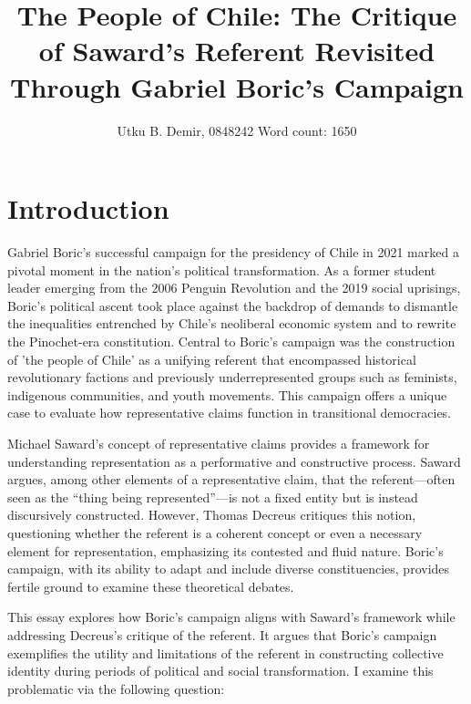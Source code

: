 

\title{\huge{The People of Chile: The Critique of Saward's Referent Revisited Through Gabriel Boric’s Campaign}}
\author{Utku B. Demir, 0848242 \newline \small{Word count: 1650}}


\maketitle
\chapter{Introduction}

Gabriel Boric’s successful campaign for the presidency of Chile in 2021 marked a pivotal moment in the nation’s political transformation. As a former student leader emerging from the 2006 Penguin Revolution and the 2019 social uprisings, Boric’s political ascent took place against the backdrop of demands to dismantle the inequalities entrenched by Chile’s neoliberal economic system and to rewrite the Pinochet-era constitution. Central to Boric’s campaign was the construction of 'the people of Chile' as a unifying referent that encompassed historical revolutionary factions and previously underrepresented groups such as feminists, indigenous communities, and youth movements. This campaign offers a unique case to evaluate how representative claims function in transitional democracies.

Michael Saward’s concept of representative claims provides a framework for understanding representation as a performative and constructive process. Saward argues, among other elements of a representative claim, that the referent—often seen as the “thing being represented”—is not a fixed entity but is instead discursively constructed. However, Thomas Decreus critiques this notion, questioning whether the referent is a coherent concept or even a necessary element for representation, emphasizing its contested and fluid nature. Boric’s campaign, with its ability to adapt and include diverse constituencies, provides fertile ground to examine these theoretical debates.

This essay explores how Boric’s campaign aligns with Saward’s framework while addressing Decreus’s critique of the referent. It argues that Boric’s campaign exemplifies the utility and limitations of the referent in constructing collective identity during periods of political and social transformation. I examine this problematic via the following question:

